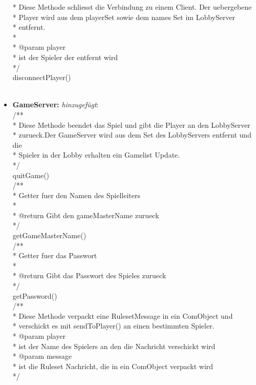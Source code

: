 \documentclass{article}
\begin{document}
\begin{itemize}
 * Diese Methode schliesst die Verbindung zu einem Client. Der uebergebene\\
 * Player wird aus dem playerSet sowie dem names Set im LobbyServer\\
 * entfernt.\\
 * \\
 * @param player\\
 *            ist der Spieler der entfernt wird\\
 */\\
disconnectPlayer()\\
\\
\item  \textbf{GameServer:} \textit{hinzugefügt}: \\
/**\\
 * Diese Methode beendet das Spiel und gibt die Player an den LobbyServer\\
 * zurueck.Der GameServer wird aus dem Set des LobbyServers entfernt und die\\
 * Spieler in der Lobby erhalten ein Gamelist Update.\\
 */\\
quitGame()\\
/**\\
 * Getter fuer den Namen des Spielleiters\\
 * \\
 * @return Gibt den gameMasterName zurueck\\
 */\\
getGameMasterName()\\
/**\\
 * Getter fuer das Passwort\\
 * \\
 * @return Gibt das Passwort des Spieles zurueck\\
 */\\
getPassword()\\
/**\\
 * Diese Methode verpackt eine RulesetMessage in ein ComObject und\\
 * verschickt es mit sendToPlayer() an einen bestimmten Spieler.\\
 * @param player\\
 *            ist der Name des Spielers an den die Nachricht verschickt wird\\
 * @param message\\
 *            ist die Ruleset Nachricht, die in ein ComObject verpackt wird\\
 */\\

\end{itemize}
\end{document}

